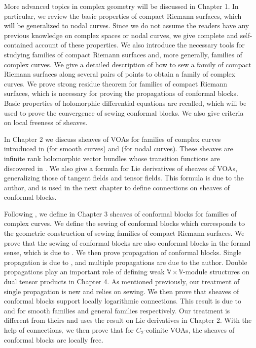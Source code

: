 \documentclass[12pt,a4paper,notitlepage]{report}
\theoremstyle{definition}
\theoremstyle{plain}
\newcommand{\Vbb}{\mathbb V}
\numberwithin{equation}{section}
\begin{document}
More advanced topics in complex geometry will be discussed in Chapter 1. In particular, we review the basic properties of compact Riemann surfaces, which will be generalized to nodal curves. Since we do not assume the readers have any previous knowledge on complex spaces or nodal curves, we give complete and self-contained account of these properties. We also introduce the necessary tools for studying families of compact Riemann surfaces and, more generally, families of complex curves. We  give a detailed description of how to sew a family of compact Riemann surfaces along several pairs of points to obtain a family of complex curves. We prove strong residue theorem for families of compact Riemann surfaces, which is necessary for proving the propagations of conformal blocks. Basic properties of holomorphic differential equations are recalled, which will be used to prove the convergence of sewing conformal blocks. We also give criteria on local freeness of sheaves.

In Chapter 2 we discuss sheaves of VOAs for families of complex curves introduced in \cite{FB04} (for smooth curves) and \cite{DGT19a} (for nodal curves). These sheaves are infinite rank holomorphic vector bundles whose transition functions are discovered in \cite{Hua97}. We also give a formula for Lie derivatives of sheaves of VOAs, generalizing those of tangent fields and tensor fields. This formula is due to the author, and is used in the next chapter to define connections on sheaves of conformal blocks.

Following \cite{FB04,DGT19a}, we define in Chapter 3 sheaves of conformal blocks for families of complex curves. We define the sewing of conformal blocks which corresponds to the geometric construction of sewing families of compact Riemann surfaces. We prove that the sewing of conformal blocks are also conformal blocks in the formal sense, which is due to \cite{DGT19b}. We then prove  propagation of conformal blocks. Single propagation is due to \cite{FB04}, and multiple propagations are due to the author. Double propagations play an important role of defining weak $\Vbb\times\Vbb$-module structures on dual tensor products in Chapter 4. As mentioned previously, our treatment of single propagation is new and relies on sewing. We then prove that sheaves of conformal blocks support locally logarithmic connections. This result is due to \cite{FB04} and \cite{DGT19a} for smooth families and general families respectively. Our treatment is different from theirs and uses the result on Lie derivatives in Chapter 2. With the help of connections, we then prove that for $C_2$-cofinite VOAs, the sheaves of conformal blocks are locally free.
\end{document}
